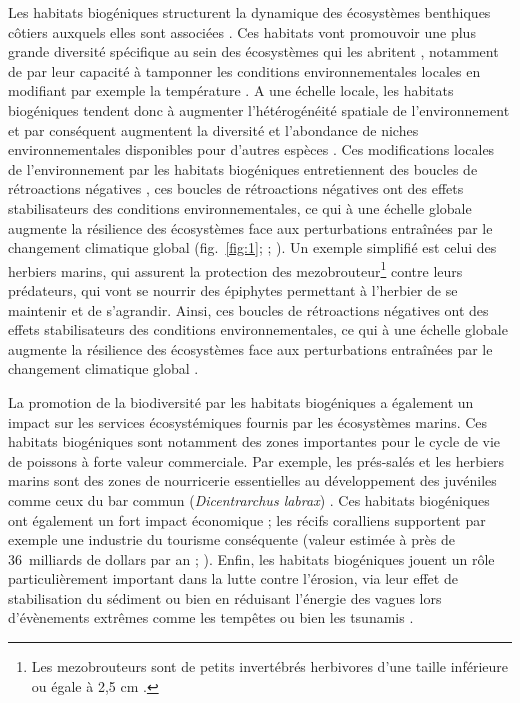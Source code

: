Les habitats biogéniques structurent la dynamique des écosystèmes
benthiques côtiers auxquels elles sont associées \autocites[
]{Duffy_2006}{Teagle_2017}. Ces habitats vont promouvoir une plus grande
diversité spécifique au sein des écosystèmes qui les abritent
\autocites[ ]{Romero_2015}{Sunday_2016}, notamment de par leur capacité
à tamponner les conditions environnementales locales en modifiant par
exemple la température \autocite{Bulleri_2018}. A une échelle locale,
les habitats biogéniques tendent donc à augmenter l'hétérogénéité
spatiale de l'environnement et par conséquent augmentent la diversité et
l'abondance de niches environnementales disponibles pour d'autres
espèces \autocites[ ]{Duffy_2006}{Hewitt_2005}. Ces modifications
locales de l'environnement par les habitats biogéniques entretiennent
des boucles de rétroactions négatives \autocite{Kefi_2016}, ces boucles
de rétroactions négatives ont des effets stabilisateurs des conditions
environnementales, ce qui à une échelle globale augmente la résilience
des écosystèmes face aux perturbations entraînées par le changement
climatique global (fig.~\ref{fig:1}; \textcite{Bulleri_2018} ;
\textcite{Jurgens_2022}). Un exemple simplifié est celui des herbiers
marins, qui assurent la protection des mezobrouteur\footnote{Les
  mezobrouteurs sont de petits invertébrés herbivores d'une taille
  inférieure ou égale à 2,5 cm \autocite{Beermann_2018}.} contre leurs
prédateurs, qui vont se nourrir des épiphytes permettant à l'herbier de
se maintenir et de s'agrandir. Ainsi, ces boucles de rétroactions
négatives ont des effets stabilisateurs des conditions
environnementales, ce qui à une échelle globale augmente la résilience
des écosystèmes face aux perturbations entraînées par le changement
climatique global \autocites[ ]{Bulleri_2018}{Jurgens_2022}.

La promotion de la biodiversité par les habitats biogéniques a également
un impact sur les services écosystémiques fournis par les écosystèmes
marins. Ces habitats biogéniques sont notamment des zones importantes
pour le cycle de vie de poissons à forte valeur commerciale. Par
exemple, les prés-salés et les herbiers marins sont des zones de
nourricerie essentielles au développement des juvéniles comme ceux du
bar commun (\emph{Dicentrarchus labrax}) \autocites[
]{Stamp_2022}{Maxwell_2017}. Ces habitats biogéniques ont également un
fort impact économique ; les récifs coralliens supportent par exemple
une industrie du tourisme conséquente (valeur estimée à près de
36~milliards de dollars par an ; \textcite{Spalding_2017}). Enfin, les
habitats biogéniques jouent un rôle particulièrement important dans la
lutte contre l'érosion, via leur effet de stabilisation du sédiment
\autocite{Reidenbach_2018} ou bien en réduisant l'énergie des vagues
lors d'évènements extrêmes comme les tempêtes \autocite{Krauss_2019} ou
bien les tsunamis \autocite{Alongi_2008}.

